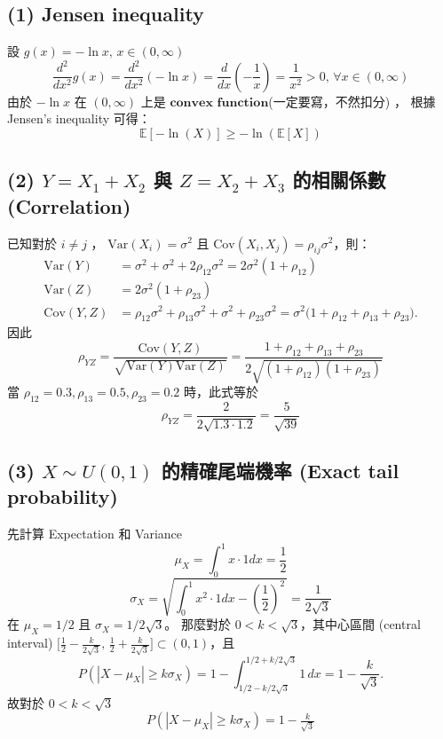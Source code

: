 \documentclass{article}
\begin{document}
\subsection*{(1) Jensen inequality}
設 $g(x) = -\ln x , \, x \in (0,\infty) $
\[
\frac{d^2}{dx^2} g(x) = \frac{d^2}{dx^2} (-\ln x) = \frac{d}{dx} (-\frac{1}{x}) =
\frac{1}{x^2} > 0 , \, \forall x \in (0,\infty)
\]
由於 $-\ln x$ 在 $(0,\infty)$ 上是 $\mathbf{convex \,\, function}$(一定要寫，不然扣分) ，
根據 Jensen's inequality 可得：
\[
\boxed{\mathbb{E}[-\ln (X)] \ge -\ln (\mathbb{E}[X])}
\]
\subsection*{(2) $Y=X_1+X_2$ 與 $Z=X_2+X_3$ 的相關係數 (Correlation)}
已知對於 $i\neq j$ ， $\mathrm{Var}(X_i)=\sigma^2$ 且 
$\mathrm{Cov}(X_i,X_j)=\rho_{ij}\sigma^2$，則：
\begin{align*}
    \mathrm{Var}(Y)&=\sigma^2+\sigma^2+2\rho_{12}\sigma^2=2\sigma^2(1+\rho_{12})\\
    \mathrm{Var}(Z)&=2\sigma^2(1+\rho_{23})\\
    \mathrm{Cov}(Y,Z)&=\rho_{12}\sigma^2+\rho_{13}\sigma^2+\sigma^2+\rho_{23}\sigma^2
    =\sigma^2\big(1+\rho_{12}+\rho_{13}+\rho_{23}\big).
\end{align*}
因此
$$
\rho_{YZ}
=\frac{\mathrm{Cov}(Y,Z)}{\sqrt{\mathrm{Var}(Y)\mathrm{Var}(Z)}}=
\frac{1+\rho_{12}+\rho_{13}+\rho_{23}}{2\sqrt{(1+\rho_{12})(1+\rho_{23})}}
$$
當 $\rho_{12}=0.3,\rho_{13}=0.5,\rho_{23}=0.2$ 時，此式等於
$$
\boxed{
\displaystyle \rho_{YZ} = \frac{2}{2\sqrt{1.3\cdot 1.2}} = \frac{5}{\sqrt{39}}
}
$$
\subsection*{(3) $X\sim U(0,1)$ 的精確尾端機率 (Exact tail probability)}
先計算 Expectation 和 Variance
\[
    \mu_X = \int_{0}^{1} x \cdot 1 dx = \frac{1}{2}
\]
\[
    \sigma_X = \sqrt{\int_{0}^{1} x^2 \cdot 1 dx - (\frac{1}{2})^2 \,}= \frac{1}{2\sqrt{3}}
\]
在 $\mu_X=1/2$ 且 $\sigma_X=1/2\sqrt{3}$。
那麼對於 $0<k<\sqrt{3}$，其中心區間 (central interval)
$\big[\tfrac12-\frac{k}{2\sqrt{3}},\,\tfrac12+\frac{k}{2\sqrt{3}}\big]\subset(0,1)$，且
$$P\!\left(\left|X-\mu_X\right|\ge k\sigma_X\right)
=1-\int_{1/2-k/2\sqrt{3}}^{1/2+k/2\sqrt{3}} 1 \, dx
=1-\frac{k}{\sqrt{3}}.$$故對於 $0<k<\sqrt{3}$
$$\boxed{~P(|X-\mu_X|\ge k\sigma_X)=1-\tfrac{k}{\sqrt{3}}~}$$
\end{document}
